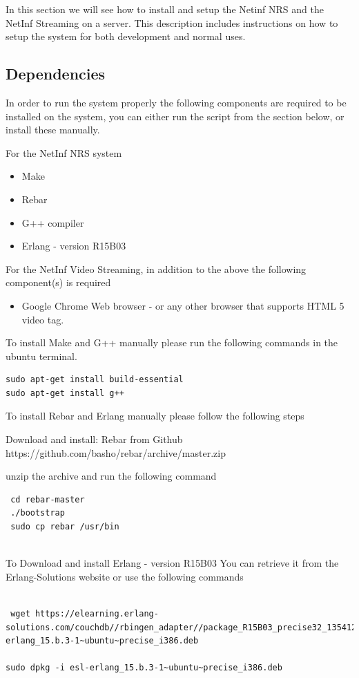 In this section we will see how to install and setup the Netinf NRS and the NetInf Streaming on a server.
This description includes instructions on how to setup the system for both development and normal uses.

\subsection{Dependencies}

In order to run the system properly the following components are required to be installed on the system, you can either run the script from the section below, or install these manually.

For the NetInf NRS system
\begin{itemize}
\item Make
\item Rebar
\item G++ compiler
\item Erlang - version R15B03
\end{itemize}

For the NetInf Video Streaming, in addition to the above the following component(s) is required
\begin{itemize}
\item Google Chrome Web browser - or any other browser that supports HTML 5 video tag.
\end{itemize}

To install Make and G++ manually please run the following commands in the ubuntu terminal.
\begin{verbatim}
sudo apt-get install build-essential
sudo apt-get install g++
\end{verbatim}

To install Rebar and Erlang manually please follow the following steps

Download and install: Rebar from Github
https://github.com/basho/rebar/archive/master.zip

unzip the archive and run the following command
\begin{verbatim}
 cd rebar-master
 ./bootstrap
 sudo cp rebar /usr/bin
 
\end{verbatim}

To Download and install Erlang - version R15B03
You can retrieve it from the Erlang-Solutions website or use the following commands

\begin{verbatim}

 wget https://elearning.erlang-solutions.com/couchdb//rbingen_adapter//package_R15B03_precise32_1354121173/esl-erlang_15.b.3-1~ubuntu~precise_i386.deb
 
sudo dpkg -i esl-erlang_15.b.3-1~ubuntu~precise_i386.deb

\end{verbatim}

